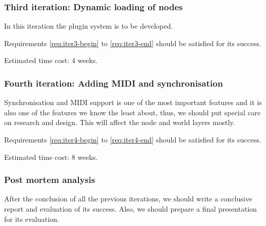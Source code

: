 \subsubsection{Third iteration: Dynamic loading of nodes}

In this iteration the plugin system is to be developed.

Requirements \ref{req:iter3-begin} to \ref{req:iter3-end} should be
satisfied for its success.

Estimated time cost: 4 weeks.

\subsubsection{Fourth iteration: Adding MIDI and synchronisation}

Synchronisation and MIDI support is one of the most important
features and it is also one of the features we know the least about,
thus, we should put special care on research and design. This will
affect the node and world layers mostly.

Requirements \ref{req:iter4-begin} to \ref{req:iter4-end} should be
satisfied for its success.

Estimated time cost: 8 weeks.

\subsubsection{Post mortem analysis}

After the conclusion of all the previous iterations, we should write a
conclusive report and evaluation of its success. Also, we should
prepare a final presentation for its evaluation.

